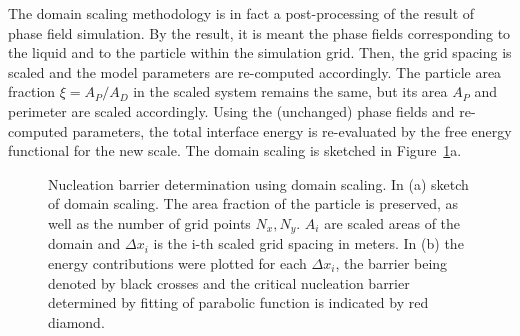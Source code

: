 The domain scaling methodology is in fact a post-processing of the result of phase field simulation. By the result, it is meant the phase fields corresponding to the liquid and to the particle within the simulation grid. Then, the grid spacing is scaled and the model parameters are re-computed accordingly. The particle area fraction $\xi=A_P/A_D$ in the scaled system remains the same, but its area $A_P$ and perimeter are scaled accordingly. Using the (unchanged) phase fields and re-computed parameters, the total interface energy is re-evaluated by the free energy functional for the new scale. The domain scaling is sketched in Figure~\ref{fig_domain_scaling}a. 

\begin{figure}
	\centering
	\caption{Nucleation barrier determination using domain scaling. In (a) sketch of domain scaling. The area fraction of the particle is preserved, as well as the number of grid points $N_x, N_y$. $A_i$ are scaled areas of the domain and $\Delta x_i$ is the i-th scaled grid spacing in meters. In (b) the energy contributions were plotted for each $\Delta x_i$, the barrier being denoted by black crosses and the critical nucleation barrier determined by fitting of parabolic function is indicated by red diamond.}
	\label{fig_domain_scaling}
\end{figure}	

